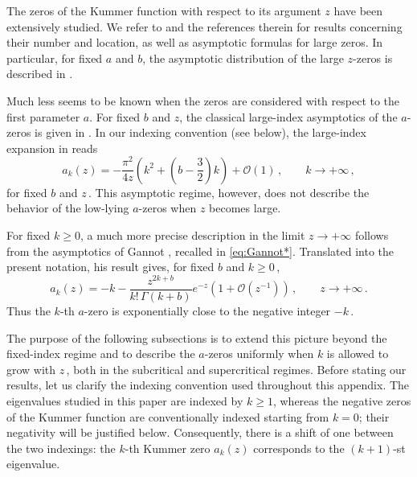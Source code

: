 \documentclass[11pt]{amsart}
\numberwithin{equation}{section}
\theoremstyle{remark}
\newcommand{\mn}{\medskip\noindent}
\begin{document}
\mn 
The zeros of the Kummer function with respect to its argument $z$
have been extensively studied. We refer to
\cite[\S 13.9]{DLMF} and the references therein for results concerning
their number and location, as well as asymptotic formulas for large
zeros. In particular, for fixed $a$ and $b$, the asymptotic
distribution of the large $z$-zeros is described in
\cite[\S 13.9, Eq.~(13.9.9)]{DLMF}.

\mn 
Much less seems to be known when the zeros are considered with respect
to the first parameter $a$. For fixed $b$ and $z$, the classical
large-index asymptotics of the $a$-zeros is given in
\cite[\S 13.9, Eq.~(13.9.10)]{DLMF}. In our indexing convention (see below), the large-index expansion
in \cite[Eq.~(13.9.10)]{DLMF} reads
\begin{equation}\label{eq:Kummer-a-large-k}
	a_k(z)
	=
	-\frac{\pi^2}{4z}
	\left(
	k^2+\left(b-\frac32\right)k
	\right)
	+\mathcal O(1)\,,
	\qquad k\to+\infty\,,
\end{equation}
for fixed $b$ and $z\,$.  This asymptotic regime, however, does not
describe the behavior of the low-lying $a$-zeros when $z$ becomes
large.

\mn
For fixed $k\geq 0$, a much more precise description in the limit
$z\to+\infty$ follows from the asymptotics of Gannot
\cite{Gannot}, recalled in \eqref{eq:Gannot*}. Translated into the present notation, his result gives,
for fixed $b$ and $k\geq0$\,,
\begin{equation}
a_k(z)
=
-k-
\frac{z^{2k+b}}{k!\,\Gamma(k+b)}
e^{-z}
\left(1+\mathcal O(z^{-1})\right)\,,
\qquad z\to+\infty\,.
\end{equation}
Thus the $k$-th $a$-zero is exponentially close to the negative
integer $-k$\,.

\mn
The purpose of the following subsections is to extend this picture
beyond the fixed-index regime and to describe the $a$-zeros uniformly
when $k$ is allowed to grow with $z\,$, both in the subcritical and
supercritical regimes. Before stating our results, let us clarify the
indexing convention used throughout this appendix. The eigenvalues studied in this paper are
indexed by $k\geq1$, whereas the negative zeros of the Kummer function
are conventionally indexed starting from  $k=0$; their negativity will be
justified below. Consequently, there is a shift of one between the two
indexings: the $k$-th Kummer zero $a_k(z)$ corresponds to the $(k+1)$-st
eigenvalue.
\end{document}
